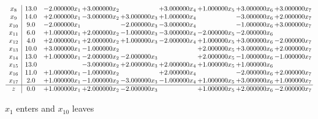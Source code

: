 \documentclass[10pt]{article}
\begin{document}
\[\begin{array}{c| c c@{\hskip 2pt} c@{\hskip 2pt} c@{\hskip 2pt} c@{\hskip 2pt} c@{\hskip 2pt} c@{\hskip 2pt} c@{\hskip 2pt} }
 x_{8}   &  13.0 & -2.000000 x_{1} & + 3.000000 x_{2} &   & + 3.000000 x_{4} & + 1.000000 x_{5} & + 3.000000 x_{6} & + 3.000000 x_{7}\\
 x_{9}   &  14.0 & + 2.000000 x_{1} & -3.000000 x_{2} & + 3.000000 x_{3} & + 1.000000 x_{4} &   & -3.000000 x_{6} & + 2.000000 x_{7}\\
 x_{10}   &  9.0 & -2.000000 x_{1} &   & -2.000000 x_{3} & -3.000000 x_{4} &   & -1.000000 x_{6} & + 3.000000 x_{7}\\
 x_{11}   &  6.0 & + 1.000000 x_{1} & + 2.000000 x_{2} & -1.000000 x_{3} & -3.000000 x_{4} & -2.000000 x_{5} & -2.000000 x_{6} &   \\
 x_{12}   &  4.0 & + 2.000000 x_{1} & + 2.000000 x_{2} & + 1.000000 x_{3} & -2.000000 x_{4} & + 1.000000 x_{5} & + 3.000000 x_{6} & -2.000000 x_{7}\\
 x_{13}   &  10.0 & + 3.000000 x_{1} & -1.000000 x_{2} &    &   & + 2.000000 x_{5} & + 3.000000 x_{6} & + 2.000000 x_{7}\\
 x_{14}   &  13.0 & + 1.000000 x_{1} & -2.000000 x_{2} & -2.000000 x_{3} &   & + 2.000000 x_{5} & -1.000000 x_{6} & -1.000000 x_{7}\\
 x_{15}   &  13.0  &   & -3.000000 x_{2} & + 2.000000 x_{3} & + 2.000000 x_{4} & + 1.000000 x_{5} & + 1.000000 x_{6} &   \\
 x_{16}   &  11.0 & + 1.000000 x_{1} & -1.000000 x_{2} &   & + 2.000000 x_{4} &   & -2.000000 x_{6} & + 2.000000 x_{7}\\
 x_{17}   &  2.0 & + 1.000000 x_{1} & -1.000000 x_{2} & -3.000000 x_{3} & -1.000000 x_{4} & + 1.000000 x_{5} & + 3.000000 x_{6} & + 1.000000 x_{7}\\
\hline
z    &  0.0 & + 1.000000 x_{1} & + 2.000000 x_{2} & -2.000000 x_{3} &   & + 1.000000 x_{5} & + 2.000000 x_{6} & -2.000000 x_{7}\\
\end{array}\]


 $ x_{1} $ enters and $ x_{10} $ leaves 
\end{document}
